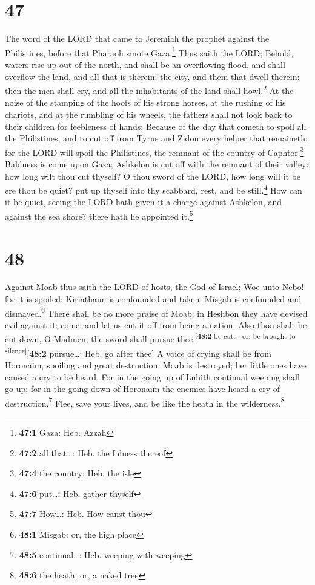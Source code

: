 \hypertarget{section-46}{%
\section{47}\label{section-46}}

 The word of the LORD that came to Jeremiah the prophet
against the Philistines, before that Pharaoh smote Gaza.\footnote{\textbf{47:1}
  Gaza: Heb. Azzah}  Thus saith the LORD; Behold, waters
rise up out of the north, and shall be an overflowing flood, and shall
overflow the land, and all that is therein; the city, and them that
dwell therein: then the men shall cry, and all the inhabitants of the
land shall howl.\footnote{\textbf{47:2} all that\ldots: Heb. the fulness
  thereof}  At the noise of the stamping of the hoofs of
his strong horses, at the rushing of his chariots, and at the rumbling
of his wheels, the fathers shall not look back to their children for
feebleness of hands;  Because of the day that cometh to
spoil all the Philistines, and to cut off from Tyrus and Zidon every
helper that remaineth: for the LORD will spoil the Philistines, the
remnant of the country of Caphtor.\footnote{\textbf{47:4} the country:
  Heb. the isle}  Baldness is come upon Gaza; Ashkelon is
cut off with the remnant of their valley: how long wilt thou cut
thyself?  O thou sword of the LORD, how long will it be
ere thou be quiet? put up thyself into thy scabbard, rest, and be
still.\footnote{\textbf{47:6} put\ldots: Heb. gather thyself}
 How can it be quiet, seeing the LORD hath given it a
charge against Ashkelon, and against the sea shore? there hath he
appointed it.\footnote{\textbf{47:7} How\ldots: Heb. How canst thou}

\hypertarget{section-47}{%
\section{48}\label{section-47}}

 Against Moab thus saith the LORD of hosts, the God of
Israel; Woe unto Nebo! for it is spoiled: Kiriathaim is confounded and
taken: Misgab is confounded and dismayed.\footnote{\textbf{48:1} Misgab:
  or, the high place}  There shall be no more praise of
Moab: in Heshbon they have devised evil against it; come, and let us cut
it off from being a nation. Also thou shalt be cut down, O Madmen; the
sword shall pursue thee.\textsuperscript{{[}\textbf{48:2} be cut\ldots:
or, be brought to silence{]}}{[}\textbf{48:2} pursue\ldots: Heb. go
after thee{]}  A voice of crying shall be from Horonaim,
spoiling and great destruction.  Moab is destroyed; her
little ones have caused a cry to be heard.  For in the
going up of Luhith continual weeping shall go up; for in the going down
of Horonaim the enemies have heard a cry of destruction.\footnote{\textbf{48:5}
  continual\ldots: Heb. weeping with weeping}  Flee, save
your lives, and be like the heath in the wilderness.\footnote{\textbf{48:6}
  the heath: or, a naked tree}

